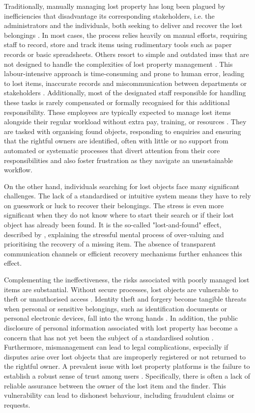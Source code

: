 Traditionally, manually managing lost property has long been plagued by inefficiencies that disadvantage its corresponding stakeholders, i.e. the administrators and the individuals, both seeking to deliver and recover the lost belongings \cite{Sinha2024}. In most cases, the process relies heavily on manual efforts, requiring staff to record, store and track items using rudimentary tools such as paper records or basic spreadsheets. Others resort to simple and outdated \acp{ims} that are not designed to handle the complexities of lost property management \cite{Guinard2008}. This labour-intensive approach is time-consuming and prone to human error, leading to lost items, inaccurate records and miscommunication between departments or stakeholders \cite{Sinha2024, Guinard2008}. Additionally, most of the designated staff responsible for handling these tasks is rarely compensated or formally recognised for this additional responsibility. These employees are typically expected to manage lost items alongside their regular workload without extra pay, training, or resources \cite{Guinard2008}. They are tasked with organising found objects, responding to enquiries and ensuring that the rightful owners are identified, often with little or no support from automated or systematic processes that divert attention from their core responsibilities and also foster frustration as they navigate an unsustainable workflow.

On the other hand, individuals searching for lost objects face many significant challenges. The lack of a standardised or intuitive system means they have to rely on guesswork or luck to recover their belongings. The stress is even more significant when they do not know where to start their search or if their lost object has already been found. It is the so-called "lost-and-found" effect, described by , explaining the stressful mental process of over-valuing and prioritising the recovery of a missing item. The absence of transparent communication channels \cite{Guinard2008} or efficient recovery mechanisms further enhances this effect.

Complementing the ineffectiveness, the risks associated with poorly managed lost items are substantial. Without secure processes, lost objects are vulnerable to theft or unauthorised access \cite{Tan2023}. Identity theft and forgery become tangible threats when personal or sensitive belongings, such as identification documents or personal electronic devices, fall into the wrong hands \cite{Xue2022}. In addition, the public disclosure of personal information associated with lost property has become a concern that has not yet been the subject of a standardised solution \cite{Xue2022}. Furthermore, mismanagement can lead to legal complications, especially if disputes arise over lost objects that are improperly registered or not returned to the rightful owner. A prevalent issue with lost property platforms is the failure to establish a robust sense of trust among users \cite{Xue2022}. Specifically, there is often a lack of reliable assurance between the owner of the lost item and the finder. This vulnerability can lead to dishonest behaviour, including fraudulent claims or requests.

